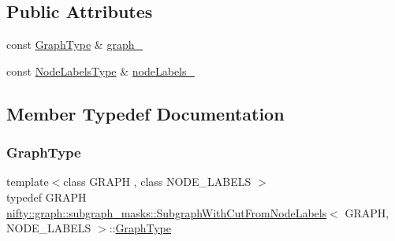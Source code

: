 \subsection*{Public Attributes}
\begin{DoxyCompactItemize}
\item 
const \hyperlink{structnifty_1_1graph_1_1subgraph__masks_1_1SubgraphWithCutFromNodeLabels_adc4d7dd452a818984b5afc989cc55a19}{Graph\+Type} \& \hyperlink{structnifty_1_1graph_1_1subgraph__masks_1_1SubgraphWithCutFromNodeLabels_a1c05f51c94a45c331bfc87c01c14945f}{graph\+\_\+}
\item 
const \hyperlink{structnifty_1_1graph_1_1subgraph__masks_1_1SubgraphWithCutFromNodeLabels_aab0ef05152a0058c18c020c8220ad30f}{Node\+Labels\+Type} \& \hyperlink{structnifty_1_1graph_1_1subgraph__masks_1_1SubgraphWithCutFromNodeLabels_ad5ab9c0ccfb9b5e654f60f1389df11af}{node\+Labels\+\_\+}
\end{DoxyCompactItemize}


\subsection{Member Typedef Documentation}
\mbox{\label{structnifty_1_1graph_1_1subgraph__masks_1_1SubgraphWithCutFromNodeLabels_adc4d7dd452a818984b5afc989cc55a19}} 
\subsubsection{\texorpdfstring{Graph\+Type}{GraphType}}
{\footnotesize\ttfamily template$<$class G\+R\+A\+PH , class N\+O\+D\+E\+\_\+\+L\+A\+B\+E\+LS $>$ \\
typedef G\+R\+A\+PH \hyperlink{structnifty_1_1graph_1_1subgraph__masks_1_1SubgraphWithCutFromNodeLabels}{nifty\+::graph\+::subgraph\+\_\+masks\+::\+Subgraph\+With\+Cut\+From\+Node\+Labels}$<$ G\+R\+A\+PH, N\+O\+D\+E\+\_\+\+L\+A\+B\+E\+LS $>$\+::\hyperlink{structnifty_1_1graph_1_1subgraph__masks_1_1SubgraphWithCutFromNodeLabels_adc4d7dd452a818984b5afc989cc55a19}{Graph\+Type}}

